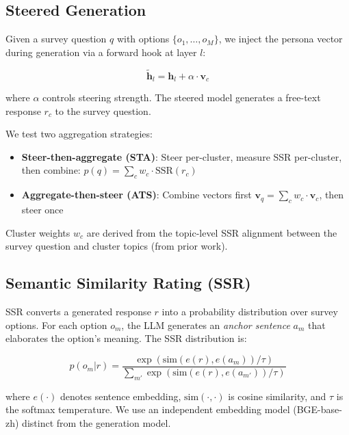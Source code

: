 \documentclass[letterpaper]{article}
\newcommand{\bfv}{\mathbf{v}}
\newcommand{\bfh}{\mathbf{h}}
\begin{document}
\subsection{Steered Generation}

Given a survey question $q$ with options $\{o_1, \ldots, o_M\}$, we inject the persona vector during generation via a forward hook at layer $l$:

\begin{equation}
    \tilde{\bfh}_l = \bfh_l + \alpha \cdot \bfv_c
    \label{eq:steering}
\end{equation}

where $\alpha$ controls steering strength. The steered model generates a free-text response $r_c$ to the survey question.

We test two aggregation strategies:
\begin{itemize}[nosep,leftmargin=*]
    \item \textbf{Steer-then-aggregate (STA)}: Steer per-cluster, measure SSR per-cluster, then combine: $p(q) = \sum_c w_c \cdot \text{SSR}(r_c)$
    \item \textbf{Aggregate-then-steer (ATS)}: Combine vectors first $\bfv_q = \sum_c w_c \cdot \bfv_c$, then steer once
\end{itemize}

Cluster weights $w_c$ are derived from the topic-level SSR alignment between the survey question and cluster topics (from prior work).

\subsection{Semantic Similarity Rating (SSR)}

SSR converts a generated response $r$ into a probability distribution over survey options. For each option $o_m$, the LLM generates an \emph{anchor sentence} $a_m$ that elaborates the option's meaning. The SSR distribution is:

\begin{equation}
    p(o_m | r) = \frac{\exp\left(\text{sim}(e(r), e(a_m)) / \tau\right)}{\sum_{m'} \exp\left(\text{sim}(e(r), e(a_{m'})) / \tau\right)}
    \label{eq:ssr}
\end{equation}

where $e(\cdot)$ denotes sentence embedding, $\text{sim}(\cdot, \cdot)$ is cosine similarity, and $\tau$ is the softmax temperature. We use an independent embedding model (BGE-base-zh) distinct from the generation model.
\end{document}
